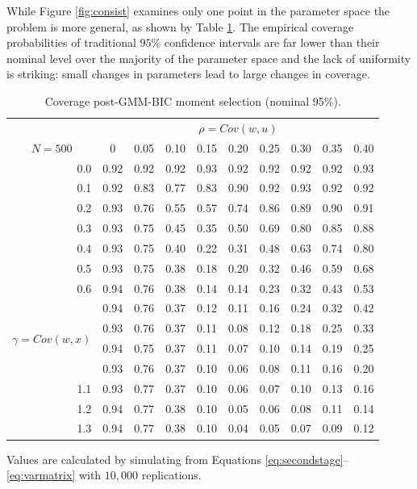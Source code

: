 \documentclass[12pt]{article}
\theoremstyle{definition}
\begin{document}
While Figure \ref{fig:consist} examines only one point in the parameter space the problem is more general, as shown by Table \ref{tab:BICcov}. 
The empirical coverage probabilities of traditional $95\%$ confidence intervals are far lower than their nominal level over the majority of the parameter space and the lack of uniformity is striking: small changes in parameters lead to large changes in coverage.

%
\begin{table}[!tbp]
\caption{Coverage post-GMM-BIC moment selection (nominal 95\%).}
\label{tab:BICcov}
\small
 \begin{center}
 \begin{tabular}{r|rrrrrrrrr}\hline\hline
&\multicolumn{9}{c}{$\rho = Cov(w,u)$}\\
\multicolumn{1}{c|}{$N = 500$}&\multicolumn{1}{c}{0}&\multicolumn{1}{c}{0.05}&\multicolumn{1}{c}{0.10}&\multicolumn{1}{c}{0.15}&\multicolumn{1}{c}{0.20}&\multicolumn{1}{c}{0.25}&\multicolumn{1}{c}{0.30}&\multicolumn{1}{c}{0.35}&\multicolumn{1}{c}{0.40}\tabularnewline
\hline
0.0&0.92&0.92&0.92&0.93&0.92&0.92&0.92&0.92&0.93\tabularnewline
0.1&0.92&0.83&0.77&0.83&0.90&0.92&0.93&0.92&0.92\tabularnewline
0.2&0.93&0.76&0.55&0.57&0.74&0.86&0.89&0.90&0.91\tabularnewline
0.3&0.93&0.75&0.45&0.35&0.50&0.69&0.80&0.85&0.88\tabularnewline
0.4&0.93&0.75&0.40&0.22&0.31&0.48&0.63&0.74&0.80\tabularnewline
0.5&0.93&0.75&0.38&0.18&0.20&0.32&0.46&0.59&0.68\tabularnewline
0.6&0.94&0.76&0.38&0.14&0.14&0.23&0.32&0.43&0.53\tabularnewline
\multirow{4}{5mm}{\begin{sideways}\parbox{1mm}{$\gamma\;$=$\;Cov(w,x)$}\end{sideways}}
0.7&0.94&0.76&0.37&0.12&0.11&0.16&0.24&0.32&0.42\tabularnewline
0.8&0.93&0.76&0.37&0.11&0.08&0.12&0.18&0.25&0.33\tabularnewline
0.9&0.94&0.75&0.37&0.11&0.07&0.10&0.14&0.19&0.25\tabularnewline
1.0&0.93&0.76&0.37&0.10&0.06&0.08&0.11&0.16&0.20\tabularnewline
1.1&0.93&0.77&0.37&0.10&0.06&0.07&0.10&0.13&0.16\tabularnewline
1.2&0.94&0.77&0.38&0.10&0.05&0.06&0.08&0.11&0.14\tabularnewline
1.3&0.94&0.77&0.38&0.10&0.04&0.05&0.07&0.09&0.12\tabularnewline
\hline
\end{tabular}
\end{center}
\footnotesize
\begin{tablenotes}
\item Values are calculated by simulating from Equations \ref{eq:secondstage}--\ref{eq:varmatrix} with $10,000$ replications.
\end{tablenotes}
\end{table}
\end{document}

